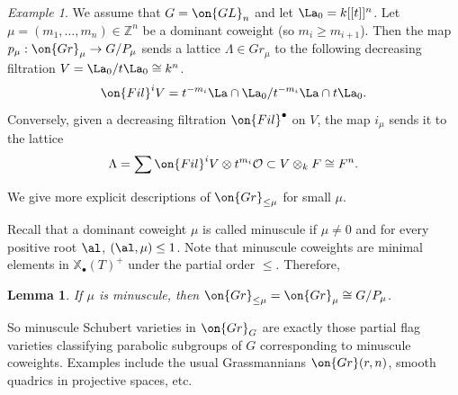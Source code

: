 \documentclass[]{pcmi}
\theoremstyle{plain}
\newtheorem{lem}[equation]{Lemma}
\theoremstyle{remark}
\newtheorem{ex}[equation]{Example}
\theoremstyle{definition}
\newcommand{\bZ}{{\mathbb Z}}
\newcommand{\mO}{{\mathcal O}}
\newcommand{\Gr}{{\on{Gr}}}
\newcommand{\GL}{{\on{GL}}}
\def\xcoch{\mathbb{X}_\bullet}
\begin{document}
\begin{ex}We assume that $G=\GL_n$ and let $\La_0=k[[t]]^n$. Let $\mu=(m_1,\ldots,m_n)\in \bZ^n$ be a dominant coweight (so $m_i\geq m_{i+1}$). Then the map $p_\mu: \Gr_\mu\to G/P_\mu$ sends a lattice $\Lambda\in Gr_\mu$ to the following decreasing filtration $V=\La_0/t\La_0\cong k^n$. 
\[\on{Fil}^iV=t^{-m_i}\La\cap \La_0/t^{-m_i}\La\cap t\La_0.\]
Conversely, given a decreasing filtration $\on{Fil}^\bullet$ on $V$, the map $i_\mu$ sends it to the lattice
\[\Lambda = \sum\on{Fil}^iV\otimes  t^{m_i} \mO\subset V\otimes_kF\cong F^n.\]
\end{ex}

We give more explicit descriptions of $\Gr_{\leq \mu}$ for small $\mu$.

Recall that a dominant coweight $\mu$ is called minuscule if $\mu\neq 0$ and for every positive root $\al$, $(\al,\mu)\leq 1$. Note that minuscule coweights are minimal elements in $\xcoch(T)^+$ under the partial order $\leq$. Therefore,
\begin{lem}\label{minusch}
If $\mu$ is minuscule, then $\Gr_{\leq\mu}=\Gr_\mu\cong G/P_\mu$.
\end{lem}
So minuscule Schubert varieties in $\Gr_G$ are exactly those partial flag varieties classifying parabolic subgroups of $G$ corresponding to minuscule coweights. Examples include the usual Grassmannians $\Gr(r,n)$, smooth quadrics in projective spaces, etc.
\end{document}
